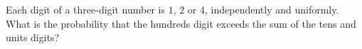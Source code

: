 Each digit of a three-digit number is $1$, $2$ or $4$, independently and uniformly. What is the probability that the hundreds digit exceeds the sum of the tens and units digits?
